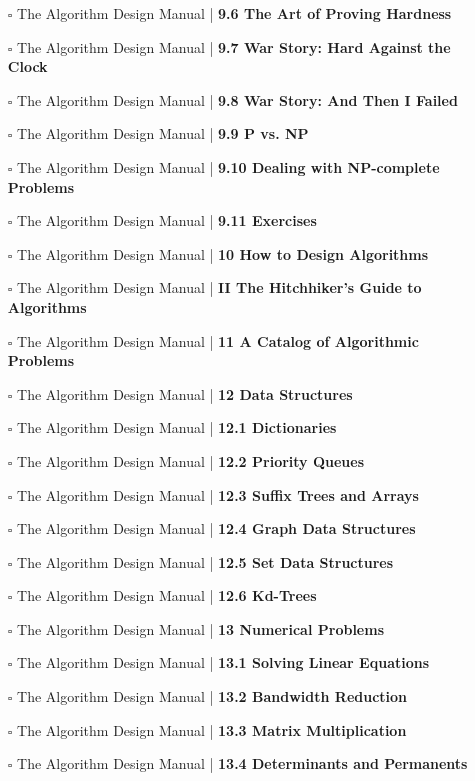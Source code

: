 \documentclass[a4, landscape, 12pt]{article}
\newcommand{\checkbox}{$\square$}%
\begin{document}
\begin{itemize}
{}
\item [\checkbox]  The Algorithm Design Manual | \textbf{ 9.6 The Art of Proving Hardness
}
\item [\checkbox]  The Algorithm Design Manual | \textbf{ 9.7 War Story: Hard Against the Clock
}
\item [\checkbox]  The Algorithm Design Manual | \textbf{ 9.8 War Story: And Then I Failed
}
\item [\checkbox]  The Algorithm Design Manual | \textbf{ 9.9 P vs. NP
}
\item [\checkbox]  The Algorithm Design Manual | \textbf{ 9.10 Dealing with NP-complete Problems
}
\item [\checkbox]  The Algorithm Design Manual | \textbf{ 9.11 Exercises
}
\item [\checkbox]  The Algorithm Design Manual | \textbf{ 10 How to Design Algorithms
}
\item [\checkbox]  The Algorithm Design Manual | \textbf{ II The Hitchhiker’s Guide to Algorithms
}
\item [\checkbox]  The Algorithm Design Manual | \textbf{ 11 A Catalog of Algorithmic Problems
}
\item [\checkbox]  The Algorithm Design Manual | \textbf{ 12 Data Structures
}
\item [\checkbox]  The Algorithm Design Manual | \textbf{ 12.1 Dictionaries
}
\item [\checkbox]  The Algorithm Design Manual | \textbf{ 12.2 Priority Queues
}
\item [\checkbox]  The Algorithm Design Manual | \textbf{ 12.3 Suffix Trees and Arrays
}
\item [\checkbox]  The Algorithm Design Manual | \textbf{ 12.4 Graph Data Structures
}
\item [\checkbox]  The Algorithm Design Manual | \textbf{ 12.5 Set Data Structures
}
\item [\checkbox]  The Algorithm Design Manual | \textbf{ 12.6 Kd-Trees
}
\item [\checkbox]  The Algorithm Design Manual | \textbf{ 13 Numerical Problems
}
\item [\checkbox]  The Algorithm Design Manual | \textbf{ 13.1 Solving Linear Equations
}
\item [\checkbox]  The Algorithm Design Manual | \textbf{ 13.2 Bandwidth Reduction
}
\item [\checkbox]  The Algorithm Design Manual | \textbf{ 13.3 Matrix Multiplication
}
\item [\checkbox]  The Algorithm Design Manual | \textbf{ 13.4 Determinants and Permanents
}
\end{itemize}
\end{document}
